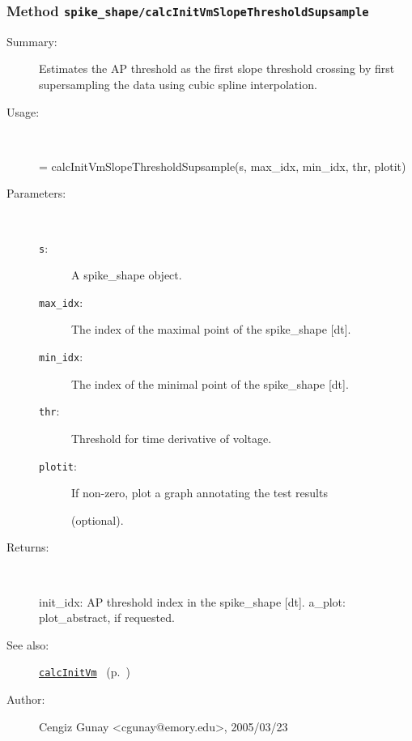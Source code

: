 \subsubsection[Method \texttt{calcInitVmSlopeThresholdSupsample}]{Method \texttt{spike\_shape/calcInitVmSlopeThresholdSupsample}}%
%
\label{ref_spike_shape__calcInitVmSlopeThresholdSupsample}%
\hypertarget{ref_spike_shape__calcInitVmSlopeThresholdSupsample}{}%
\begin{description}
\item[Summary:]Estimates the AP threshold as the first slope threshold crossing by first supersampling the data using cubic spline interpolation.
%
\item[Usage:]~%
\begin{lyxcode}%
[init\_idx, a\_plot] = calcInitVmSlopeThresholdSupsample(s, max\_idx, min\_idx, thr, plotit)
%
\end{lyxcode}%
%
%
\item[Parameters:]~
\begin{description}%
\item[\texttt{s}:]
 A spike\_shape object.
\item[\texttt{max\_idx}:]
 The index of the maximal point of the spike\_shape [dt].
\item[\texttt{min\_idx}:]
 The index of the minimal point of the spike\_shape [dt].
\item[\texttt{thr}:]
 Threshold for time derivative of voltage.
\item[\texttt{plotit}:]
 If non-zero, plot a graph annotating the test results 

(optional).\end{description}%
%
\item[Returns:]~

	init\_idx: AP threshold index in the spike\_shape [dt].
	a\_plot: plot\_abstract, if requested.
%
%
\item[See also:]%
\hyperlink{ref_calcInitVm}{\texttt{calcInitVm}}%
\ (p.~\pageref{ref_calcInitVm})%
%
%
\item[Author:]%
Cengiz Gunay <cgunay@emory.edu>, 2005/03/23%
\end{description}
\methodline%
